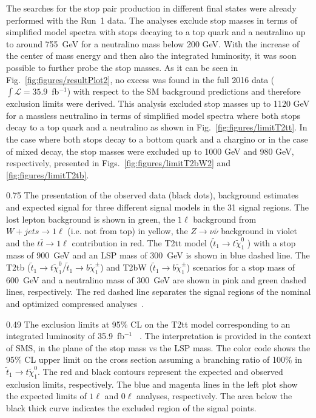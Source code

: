 The searches for the stop pair production in different final states were already performed with the Run~1 data. The analyses exclude stop masses in terms of simplified model spectra with stops decaying to  a top quark and a neutralino up to around 755~GeV for a neutralino mass below 200 GeV. With the increase of the center of mass energy and then also the integrated luminosity, it was soon possible to further probe the stop masses. As it can be seen in Fig.~\ref{fig:figures/resultPlot2}, no excess was found in the full 2016 data ($\int{\mathcal{L}}=35.9$~fb$^{-1}$) with respect to the SM background predictions and therefore exclusion limits were derived. This analysis excluded stop masses up to 1120 GeV for a massless neutralino in terms of simplified model spectra where both stops decay to a top quark and a neutralino as shown in Fig.~\ref{fig:figures/limitT2tt}. In the case where both stops decay to a bottom quark and a chargino or in the case of mixed decay, the stop masses were excluded up to 1000 GeV  and 980 GeV, respectively, presented in Figs.~\ref{fig:figures/limitT2bW2} and \ref{fig:figures/limitT2tb}.

                 {0.75}       %
                 { The presentation of the observed data (black dots), background estimates and expected signal for three different signal models in the 31 signal regions. The lost lepton background is shown in green, the $1 \ell$ background from $W+jets \to 1\ell$ (i.e. not from top) in yellow, the $Z \to \nu \bar{\nu}$ background in violet and the $t\bar{t} \to 1\ell$ contribution in red. The T2tt model ($\tilde{t}_{1} \to t \tilde{\chi}^{0}_{1}$ ) with a stop mass of 900~GeV and an LSP mass of 300~GeV is shown in blue dashed line. The T2tb ($\tilde{t}_{1} \to t \tilde{\chi}^{0}_{1} /\tilde{t}_{1} \to b \tilde{\chi}^{\pm}_{1}$) and T2bW ($\tilde{t}_{1} \to b \tilde{\chi}^{\pm}_{1}$) scenarios for a stop mass of 600~GeV and a neutralino mass of 300~GeV are shown in pink and green dashed lines, respectively. The red dashed line separates the signal regions of the nominal and optimized compressed analyses~\cite{Sirunyan:2017xse}. }

                 {0.49}       %
                 { The exclusion limits at 95\% CL on the T2tt model corresponding to an integrated luminosity of 35.9~fb$^{-1}$ ~\cite{Sirunyan:2017xse}. The interpretation is provided in the context of SMS, in the plane of the stop mass vs the LSP mass. The color code shows the 95\% CL upper limit on the cross section assuming a branching ratio of 100\% in $ \tilde{t}_{1} \to t  \tilde{\chi}^{0}_{1} $. The red and black contours represent the expected and observed exclusion limits, respectively. The blue and magenta lines in the left plot show the expected limits of $1 \ell$ and $0 \ell$ analyses, respectively.  The area below the black thick curve indicates the excluded region of the signal points.  }


